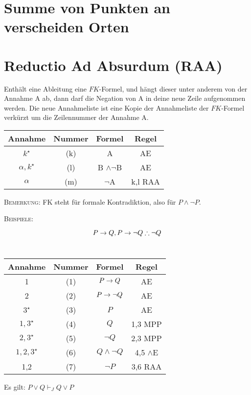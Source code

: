 \documentclass{sajzk}
\begin{document}
\section{Summe von Punkten an verscheiden Orten}
\section{Reductio Ad Absurdum (RAA)}
\label{o9ls}

Enthält eine Ableitung eine $FK$-Formel, und hängt dieser unter anderem von der
Annahme A ab, dann darf die Negation von A in deine neue Zeile aufgenommen
werden. Die neue Annahmeliste ist eine Kopie der Annahmeliste der $FK$-Formel
verkürzt um die Zeilennummer der Annahme A.

\begin{center}
\begin{tabular}{|c|c|c|c|}
  \hline
  Annahme                  & Nummer & Formel            & Regel \\
  \hline
  $k^\star$                & (k)    & A                 & AE \\
  \hline
  $\alpha, k^\star$        & (l)    & B $\land\lnot$B   & AE \\
  \hline
  $\alpha$                 & (m)    & $\lnot$A          & k,l RAA\\
  \hline
\end{tabular}
\end{center}
\textsc{Bemerkung:} FK steht für formale Kontradiktion, also für $P\land\lnot
P$.

\textsc{Beispiele:}
\begin{center}
    \[P \rightarrow Q, P \rightarrow\lnot Q \therefore \lnot Q \] \\
\begin{tabular}{|c|c|c|c|}
  \hline
  Annahme            & Nummer & Formel           & Regel \\
  \hline
  1                  & (1)    & $P \rightarrow Q$        & AE \\
  \hline
  2                  & (2)    & $P \rightarrow\lnot Q$   & AE \\
  \hline
  $3^\star$          & (3)    & $P$              & AE \\
  \hline
  $1, 3^\star$       & (4)    & $Q$              & 1,3 MPP \\
  \hline
  $2, 3^\star$       & (5)    & $\lnot Q$        & 2,3 MPP \\
  \hline
  $1,2,3^\star$      & (6)    & $Q \land\lnot Q$ & 4,5 $\land$E \\
  \hline
  1,2                & (7)    & $\lnot P$        & 3,6 RAA \\
  \hline
\end{tabular}
\end{center}
Es gilt: $P \lor Q \vdash_J Q \lor P$
\end{document}
